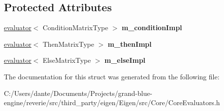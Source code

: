 \subsection*{Protected Attributes}
\begin{DoxyCompactItemize}
\item 
\mbox{\label{struct_eigen_1_1internal_1_1evaluator_3_01_select_3_01_condition_matrix_type_00_01_then_matrix_t0c555ecce04e199df0b1ebada3749ccc_a4a4f252dfcd68816cbf761ba477a2118}} 
\mbox{\hyperlink{struct_eigen_1_1internal_1_1evaluator}{evaluator}}$<$ Condition\+Matrix\+Type $>$ {\bfseries m\+\_\+condition\+Impl}
\item 
\mbox{\label{struct_eigen_1_1internal_1_1evaluator_3_01_select_3_01_condition_matrix_type_00_01_then_matrix_t0c555ecce04e199df0b1ebada3749ccc_aac1fd117fd1c31383784dc8dee78d0f3}} 
\mbox{\hyperlink{struct_eigen_1_1internal_1_1evaluator}{evaluator}}$<$ Then\+Matrix\+Type $>$ {\bfseries m\+\_\+then\+Impl}
\item 
\mbox{\label{struct_eigen_1_1internal_1_1evaluator_3_01_select_3_01_condition_matrix_type_00_01_then_matrix_t0c555ecce04e199df0b1ebada3749ccc_ac48d2f6fd603e25987c9b5815427c096}} 
\mbox{\hyperlink{struct_eigen_1_1internal_1_1evaluator}{evaluator}}$<$ Else\+Matrix\+Type $>$ {\bfseries m\+\_\+else\+Impl}
\end{DoxyCompactItemize}


The documentation for this struct was generated from the following file\+:\begin{DoxyCompactItemize}
\item 
C\+:/\+Users/dante/\+Documents/\+Projects/grand-\/blue-\/engine/reverie/src/third\+\_\+party/eigen/\+Eigen/src/\+Core/Core\+Evaluators.\+h\end{DoxyCompactItemize}
